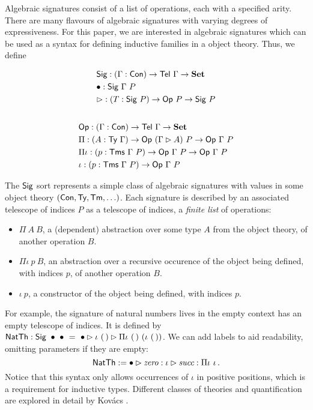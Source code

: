 Algebraic signatures \cite{Adamek2010-ls,Kovacs2023-gq} consist of a list of operations, each with a specified
arity. There are many flavours of algebraic signatures with varying degrees of
expressiveness. For this paper, we are interested in algebraic signatures which can
be used as a syntax for defining inductive families in a object theory. Thus, we define
{\small%
\begin{minipage}[t]{0.4\textwidth}
\begin{align*}
&\textsf{Sig} : (\Gamma : \textsf{Con}) \to \textsf{Tel}\ \Gamma \to \mathbf{Set} \\
&\bullet : \textsf{Sig}\ \Gamma\ P \\
&\rhd : (T : \textsf{Sig}\ P) \to \textsf{Op}\ P \to \textsf{Sig}\ P \\[1em]
\end{align*}
\end{minipage}%
\begin{minipage}[t]{0.6\textwidth}
\begin{align*}
&\textsf{Op} : (\Gamma : \textsf{Con}) \to \textsf{Tel}\ \Gamma \to \mathbf{Set} \\
&\Pi : (A : \textsf{Ty}\ \Gamma) \to \textsf{Op}\ (\Gamma \rhd A)\ P \to \textsf{Op}\ \Gamma\ P \\
&\Pi\iota : (p : \textsf{Tms}\ \Gamma\ P) \to \textsf{Op}\ \Gamma\ P \to \textsf{Op}\ \Gamma\ P \\
&\iota : (p : \textsf{Tms}\ \Gamma\ P) \to \textsf{Op}\ \Gamma\ P
\end{align*}
\end{minipage}}
The $\textsf{Sig}$ sort represents a simple class of algebraic signatures with
values in some object theory $(\textsf{Con}, \textsf{Ty}, \textsf{Tm}, \ldots)$. Each
signature is described by an associated telescope of indices $P$ as a telescope
of indices, a \emph{finite list} of operations: \begin{itemize}
    \item $\Pi\ A\ B$, a (dependent) abstraction over some type $A$ from the
    object theory, of another operation $B$. \item $\Pi\iota\ p\ B$, an
    abstraction over a recursive occurence of
    the object being defined, with indices $p$, of another operation
    $B$.
    \item $\iota\ p$, a constructor of the object being defined, with indices $p$.
\end{itemize}
For example, the signature of natural numbers lives in the empty context has an
empty telescope of indices. It is defined by $\mta{NatTh} : \mta{Sig}\
\bullet\ \bullet\ =\ \bullet \rhd \iota\ (\,) \rhd \Pi\iota\ (\,)\ (\iota\
(\,))$. We can add labels to aid readability, omitting parameters if they are empty:
\[
\textsf{NatTh} := \bullet \rhd \textit{zero} : \iota \rhd \textit{succ} : \Pi\iota\ \iota \,.
\]
Notice that this syntax only allows occurrences of $\iota$ in positive
positions, which is a requirement for inductive types.
Different classes of theories and quantification are explored in detail by
Kov\'acs \cite{Kovacs2023-gq}.

